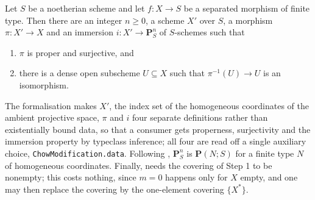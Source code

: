 \begin{theorem}\label{thm:chow-lemma}
\leanok
Let $S$ be a noetherian scheme and let $f\colon X\to S$ be a separated morphism
of finite type.  Then there are an integer $n\geq0$, a scheme $X'$ over $S$, a
morphism $\pi\colon X'\to X$ and an immersion $i\colon X'\to\mathbf P^n_S$ of
$S$-schemes such that
\begin{enumerate}
  \item $\pi$ is proper and surjective, and
  \item there is a dense open subscheme $U\subseteq X$ such that
  $\pi^{-1}(U)\to U$ is an isomorphism.
\end{enumerate}

The formalisation makes $X'$, the index set of the homogeneous coordinates of
the ambient projective space, $\pi$ and $i$ four separate definitions rather
than existentially bound data, so that a consumer gets properness, surjectivity
and the immersion property by typeclass inference; all four are read off a
single auxiliary choice, \texttt{ChowModification.data}.  Following
, $\mathbf P^n_S$ is
$\mathbf P(N;S)$ for a finite type $N$ of homogeneous coordinates.  Finally,
 needs the covering of Step 1 to be nonempty; this costs
nothing, since $m=0$ happens only for $X$ empty, and one may then replace the
covering by the one-element covering $\{X^{*}\}$.
\end{theorem}
